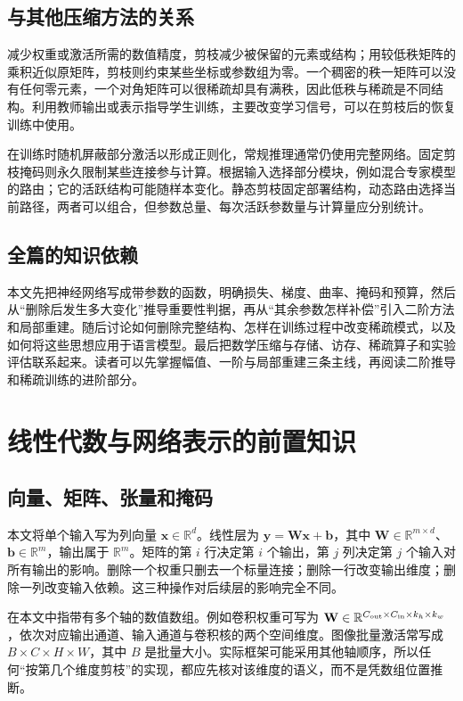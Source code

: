 \documentclass[UTF8,12pt,a4paper,fontset=fandol]{ctexart}
\begin{document}
\subsection{与其他压缩方法的关系}
减少权重或激活所需的数值精度，剪枝减少被保留的元素或结构；用较低秩矩阵的乘积近似原矩阵，剪枝则约束某些坐标或参数组为零。一个稠密的秩一矩阵可以没有任何零元素，一个对角矩阵可以很稀疏却具有满秩，因此低秩与稀疏是不同结构。利用教师输出或表示指导学生训练，主要改变学习信号，可以在剪枝后的恢复训练中使用。

在训练时随机屏蔽部分激活以形成正则化，常规推理通常仍使用完整网络。固定剪枝掩码则永久限制某些连接参与计算。根据输入选择部分模块，例如混合专家模型的路由；它的活跃结构可能随样本变化。静态剪枝固定部署结构，动态路由选择当前路径，两者可以组合，但参数总量、每次活跃参数量与计算量应分别统计。

\subsection{全篇的知识依赖}
本文先把神经网络写成带参数的函数，明确损失、梯度、曲率、掩码和预算，然后从“删除后发生多大变化”推导重要性判据，再从“其余参数怎样补偿”引入二阶方法和局部重建。随后讨论如何删除完整结构、怎样在训练过程中改变稀疏模式，以及如何将这些思想应用于语言模型。最后把数学压缩与存储、访存、稀疏算子和实验评估联系起来。读者可以先掌握幅值、一阶与局部重建三条主线，再阅读二阶推导和稀疏训练的进阶部分。

\section{线性代数与网络表示的前置知识}
\label{sec:prune-linear}

\subsection{向量、矩阵、张量和掩码}
本文将单个输入写为列向量 $\mathbf x\in\mathbb R^d$。线性层为 $\mathbf y=\mathbf W\mathbf x+\mathbf b$，其中 $\mathbf W\in\mathbb R^{m\times d}$、$\mathbf b\in\mathbb R^m$，输出属于 $\mathbb R^m$。矩阵的第 $i$ 行决定第 $i$ 个输出，第 $j$ 列决定第 $j$ 个输入对所有输出的影响。删除一个权重只删去一个标量连接；删除一行改变输出维度；删除一列改变输入依赖。这三种操作对后续层的影响完全不同。

在本文中指带有多个轴的数值数组。例如卷积权重可写为 $\mathbf W\in\mathbb R^{C_{\rm out}\times C_{\rm in}\times k_h\times k_w}$，依次对应输出通道、输入通道与卷积核的两个空间维度。图像批量激活常写成 $B\times C\times H\times W$，其中 $B$ 是批量大小。实际框架可能采用其他轴顺序，所以任何“按第几个维度剪枝”的实现，都应先核对该维度的语义，而不是凭数组位置推断。
\end{document}
